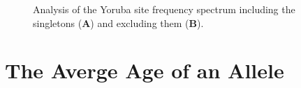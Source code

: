 \documentclass[a4paper, english]{article}
\begin{document}
\begin{figure}
  \begin{center}
  \end{center}
  \caption{Analysis of the Yoruba site frequency spectrum including
    the singletons (\textbf{A}) and excluding them
    (\textbf{B}).}\label{fig:yri}
\end{figure}


\section{The Averge Age of an Allele}
\end{document}
